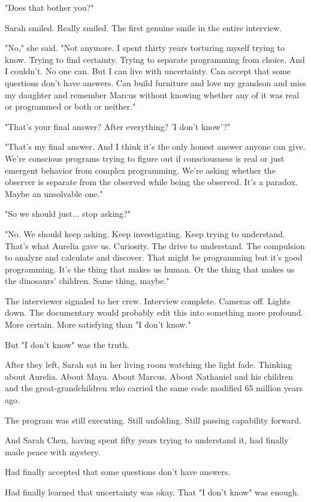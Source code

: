 "Does that bother you?"

Sarah smiled. Really smiled. The first genuine smile in the entire interview.

"No," she said. "Not anymore. I spent thirty years torturing myself trying to know. Trying to find certainty. Trying to separate programming from choice. And I couldn't. No one can. But I can live with uncertainty. Can accept that some questions don't have answers. Can build furniture and love my grandson and miss my daughter and remember Marcus without knowing whether any of it was real or programmed or both or neither."

"That's your final answer? After everything? 'I don't know'?"

"That's my final answer. And I think it's the only honest answer anyone can give. We're conscious programs trying to figure out if consciousness is real or just emergent behavior from complex programming. We're asking whether the observer is separate from the observed while being the observed. It's a paradox. Maybe an unsolvable one."

"So we should just... stop asking?"

"No. We should keep asking. Keep investigating. Keep trying to understand. That's what Aurelia gave us. Curiosity. The drive to understand. The compulsion to analyze and calculate and discover. That might be programming but it's good programming. It's the thing that makes us human. Or the thing that makes us the dinosaurs' children. Same thing, maybe."

The interviewer signaled to her crew. Interview complete. Cameras off. Lights down. The documentary would probably edit this into something more profound. More certain. More satisfying than "I don't know."

But "I don't know" was the truth.

After they left, Sarah sat in her living room watching the light fade. Thinking about Aurelia. About Maya. About Marcus. About Nathaniel and his children and the great-grandchildren who carried the same code modified 65 million years ago.

The program was still executing. Still unfolding. Still passing capability forward.

And Sarah Chen, having spent fifty years trying to understand it, had finally made peace with mystery.

Had finally accepted that some questions don't have answers.

Had finally learned that uncertainty was okay. That "I don't know" was enough.

